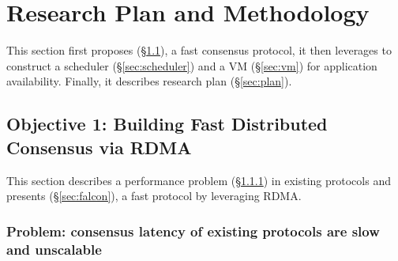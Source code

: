 \vspace{-.15in}\section{Research Plan and Methodology}
\label{sec:rep}\vspace{-.075in}

This section first proposes \falcon 
(\S\ref{sec:protocol}), a fast consensus protocol, it then leverages \falcon to 
construct a scheduler (\S\ref{sec:scheduler}) and a VM (\S\ref{sec:vm}) for 
application availability. Finally, it describes 
research plan (\S\ref{sec:plan}).

\vspace{-.15in}\subsection{Objective 1: Building Fast Distributed Consensus via
RDMA}\label{sec:protocol}\vspace{-.075in}

This section describes a performance problem (\S\ref{sec:latency-problem}) in 
existing \paxos protocols and presents \falcon (\S\ref{sec:falcon}), a 
fast \paxos protocol by leveraging RDMA.

\vspace{-.15in}
\subsubsection{Problem: consensus latency of existing \paxos 
protocols are slow and unscalable} 
\label{sec:latency-problem}\vspace{-.075in}




